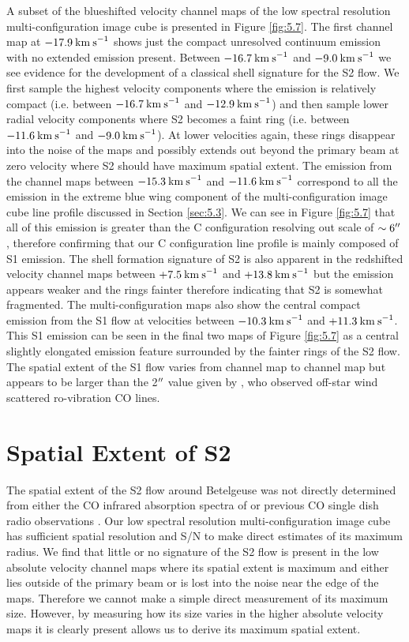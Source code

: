 A subset of the blueshifted velocity channel maps of the low spectral resolution multi-configuration image cube is presented in Figure \ref{fig:5.7}. The first channel map at $-17.9\>{\rm km\>s}^{-1}$ shows just the compact unresolved continuum emission with no extended emission present. Between $-16.7\>{\rm km\>s}^{-1}$ and $-9.0\>{\rm km\>s}^{-1}$ we see evidence for the development of a classical shell signature for the S2 flow. We first sample the highest velocity components where the emission is relatively compact (i.e. between $-16.7\>{\rm km\>s}^{-1}$ and $-12.9\>{\rm km\>s}^{-1}$) and then sample lower radial velocity components where S2 becomes a faint ring (i.e. between $-11.6\>{\rm km\>s}^{-1}$ and $-9.0\>{\rm km\>s}^{-1}$). At lower velocities again, these rings disappear into the noise of the maps and possibly extends out beyond the primary beam at zero velocity where S2 should have maximum spatial extent. The emission from the channel maps between $-15.3\>{\rm km\>s}^{-1}$ and $-11.6\>{\rm km\>s}^{-1}$ correspond to all the emission in the extreme blue wing component of the multi-configuration image cube line profile discussed in Section \ref{sec:5.3}. We can see in Figure \ref{fig:5.7} that all of this emission is greater than the C configuration resolving out scale of $\sim 6^{\prime\prime}$, therefore confirming that our C configuration line profile is mainly composed of S1 emission. The shell formation signature of S2 is also apparent in the redshifted velocity channel maps between $+7.5\>{\rm km\>s}^{-1}$ and $+13.8\>{\rm km\>s}^{-1}$ but the emission appears weaker and the rings fainter therefore indicating that S2 is somewhat fragmented. The multi-configuration maps also show the central compact emission from the S1 flow at velocities between $-10.3\>{\rm km\>s}^{-1}$ and $+11.3\>{\rm km\>s}^{-1}$. This S1 emission can be seen in the final two maps of Figure \ref{fig:5.7} as a central slightly elongated emission feature surrounded by the fainter rings of the S2 flow. The spatial extent of the S1 flow varies from channel map to channel map but appears to be larger than the 2$^{\prime\prime}$ value given by \cite{smith_2009}, who observed off-star wind scattered ro-vibration CO lines. 

\section{Spatial Extent of S2}\label{sec:5.6}
The spatial extent of the S2 flow around Betelgeuse was not directly determined from either the CO infrared absorption spectra of \cite{bernat_1979} or previous CO single dish radio observations \citep{knapp_1980, huggins_1987, huggins_1994}. Our low spectral resolution multi-configuration image cube has sufficient spatial resolution and S/N to make direct estimates of its maximum radius. We find that little or no signature of the S2 flow is present in the low absolute velocity channel maps where its spatial extent is maximum and either lies outside of the primary beam or is lost into the noise near the edge of the maps. Therefore we cannot make a simple direct measurement of its maximum size. However, by measuring how its size varies in the higher absolute velocity maps it is clearly present allows us to derive its maximum spatial extent. 

